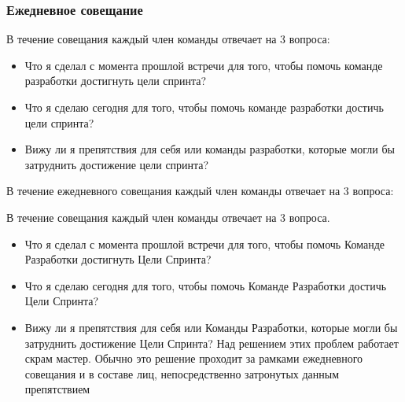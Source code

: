 \documentclass{../industrial-development}
\begin{document}
\begin{frame} \frametitle{Ежедневное совещание}
\begin {block} {В течение совещания каждый член команды отвечает на 3 вопроса:}
\begin{itemize}
\item Что я сделал с момента прошлой встречи для того, чтобы помочь команде разработки достигнуть цели спринта?
\item Что я сделаю сегодня для того, чтобы помочь команде разработки достичь цели спринта?
\item Вижу ли я препятствия для себя или команды разработки, которые могли бы затруднить достижение цели спринта? 
\end{itemize}
\end {block}
\end{frame}

\begin {block} {В течение ежедневного совещания каждый член команды отвечает на 3 вопроса:}
В течение совещания каждый член команды отвечает на 3 вопроса.
\begin{itemize}
\item Что я сделал с момента прошлой встречи для того, чтобы помочь Команде Разработки достигнуть Цели Спринта?
\item Что я сделаю сегодня для того, чтобы помочь Команде Разработки достичь Цели Спринта?
\item Вижу ли я препятствия для себя или Команды Разработки, которые могли бы затруднить достижение Цели Спринта? Над решением этих проблем работает скрам мастер. Обычно это решение проходит за рамками ежедневного совещания и в составе лиц, непосредственно затронутых данным препятствием~\cite{Scrum}
\end{itemize}
\end {block}
\end{document}
